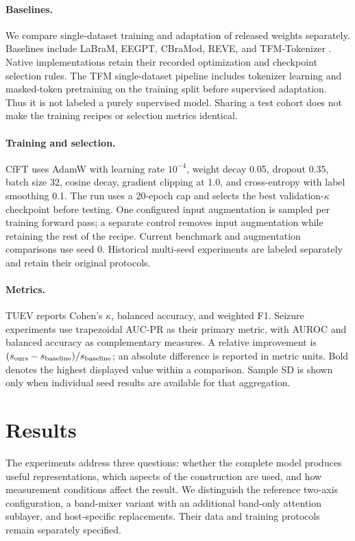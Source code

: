 \documentclass[10pt,twocolumn,letterpaper]{article}
\begin{document}
\paragraph{Baselines.}
We compare single-dataset training and adaptation of released weights
separately. Baselines include LaBraM, EEGPT, CBraMod, REVE, and
TFM-Tokenizer
\citep{jiang2024labram,wang2024eegpt,wang2025cbramod,elouahidi2025reve,pradeepkumar2026tfm}.
Native implementations retain their recorded optimization and checkpoint
selection rules. The TFM single-dataset pipeline includes tokenizer
learning and masked-token pretraining on the training split before
supervised adaptation. Thus it is not labeled a purely supervised model.
Sharing a test cohort does not make the training recipes or selection
metrics identical.

\paragraph{Training and selection.}
CfFT uses AdamW \citep{loshchilov2019decoupled} with learning rate
$10^{-4}$, weight decay 0.05, dropout 0.35, batch size 32, cosine decay,
gradient clipping at 1.0, and cross-entropy with label smoothing 0.1.
The run uses a 20-epoch cap and selects the best validation-$\kappa$
checkpoint before testing. One configured input augmentation is sampled
per training forward pass; a separate control removes input augmentation
while retaining the rest of the recipe. Current benchmark and augmentation
comparisons use seed 0. Historical multi-seed experiments are labeled
separately and retain their original protocols.

\paragraph{Metrics.}
TUEV reports Cohen's $\kappa$, balanced accuracy, and weighted F1.
Seizure experiments use trapezoidal AUC-PR as their primary metric,
with AUROC and balanced accuracy as complementary measures. A relative
improvement is $(s_{\rm ours}-s_{\rm baseline})/s_{\rm baseline}$;
an absolute difference is reported in metric units. Bold denotes the
highest displayed value within a comparison. Sample SD is shown only
when individual seed results are available for that aggregation.

\section{Results}
\label{sec:results}
The experiments address three questions: whether the complete model
produces useful representations, which aspects of the construction are
used, and how measurement conditions affect the result. We distinguish
the reference two-axis configuration, a band-mixer variant with an
additional band-only attention sublayer, and host-specific replacements.
Their data and training protocols remain separately specified.
\end{document}
